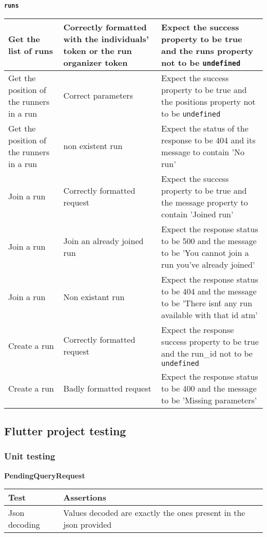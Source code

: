 \noindent\textbf{\texttt{runs}}
\begin{longtable}{|p{}|p{}|p{}|}
Get the list of runs  & Correctly formatted with the individuals' token or the run organizer token  & Expect the success property to be true and the runs property not to be \texttt{undefined} \\
\hline
Get the position of the runners in a run & Correct parameters & Expect the success property to be true and the positions property not to be \texttt{undefined} \\ 
\hline
Get the position of the runners in a run & non existent run & Expect the status of the response to be 404 and its message to contain 'No run' \\
\hline
Join a run & Correctly formatted request & Expect the success property to be true and the message property to contain 'Joined run' \\
\hline
Join a run & Join an already joined run & Expect the response status to be 500 and the message to be 'You cannot join a run you've already joined' \\
\hline
Join a run & Non existant run & Expect the response status to be 404 and the message to be 'There isn\'t any run available with that id atm' \\
\hline
Create a run & Correctly formatted request & Expect the response success property to be true and the run\_id not to be \texttt{undefined} \\
\hline
Create a run & Badly formatted request & Expect the response status to be 400 and the message to be 'Missing parameters' \\
\hline
\end{longtable}


\subsection{Flutter project testing}


\subsubsection{Unit testing}


\noindent\textbf{PendingQueryRequest} 

\begin{longtable}[htb]{|p{}|p{}|}
    \hline
    \textbf{Test} & \textbf{Assertions} \\
    \hline
    Json decoding & Values decoded are exactly the ones present in the json provided\\
    \hline
\end{longtable}

